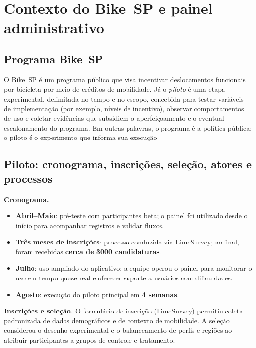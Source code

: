 
\chapter{Contexto do Bike~SP e painel administrativo}
\label{cap:contexto-painel}

\section{Programa Bike~SP}
O Bike~SP é um programa público que visa incentivar deslocamentos funcionais por
bicicleta por meio de créditos de mobilidade. Já o \textit{piloto} é uma etapa
experimental, delimitada no tempo e no escopo, concebida para testar variáveis
de implementação (por exemplo, níveis de incentivo), observar comportamentos de
uso e coletar evidências que subsidiem o aperfeiçoamento e o eventual
escalonamento do programa. Em outras palavras, o programa é a política pública;
o piloto é o experimento que informa sua execução
\citep{faria2023:bikespCaseStudy, interscity:pilotoBikeSP}.

\section{Piloto: cronograma, inscrições, seleção, atores e processos}
\textbf{Cronograma.} \begin{itemize}
  \item \textbf{Abril--Maio}: pré-teste com participantes beta; o painel foi
        utilizado desde o início para acompanhar registros e validar fluxos.
  \item \textbf{Três meses de inscrições}: processo conduzido via LimeSurvey;
        ao final, foram recebidas \textbf{cerca de 3000 candidaturas}.
  \item \textbf{Julho}: uso ampliado do aplicativo; a equipe operou o painel
        para monitorar o uso em tempo quase real e oferecer suporte a usuários
        com dificuldades.
  \item \textbf{Agosto}: execução do piloto principal em \textbf{4 semanas}.
\end{itemize}

\textbf{Inscrições e seleção.} O formulário de inscrição (LimeSurvey) permitiu
coleta padronizada de dados demográficos e de contexto de mobilidade. A seleção
considerou o desenho experimental e o balanceamento de perfis e regiões ao
atribuir participantes a grupos de controle e tratamento.

